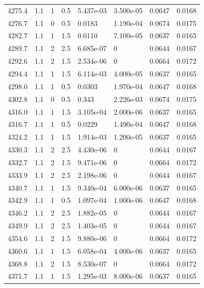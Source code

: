 \documentclass[preview]{standalone}
\begin{document}
{{{{{{{{{{{{{{{{\begin{tabular}{L{1.2cm}C{1.2cm} C{0.3cm}C{0.5cm} C{1.4cm}C{1.4cm} C{1.4cm}C{1.4cm}}
  4275.4  &   1.1  & 1     & 0.5 &  5.437e-03  & 3.500e-05  & 0.0647 &  0.0168   \\ 
  4276.7  &   1.1  & 0     & 0.5 &  0.0183  & 1.190e-04  & 0.0674 &  0.0175   \\ 
  4282.7  &   1.1  & 1     & 1.5 &  0.0110  & 7.100e-05  & 0.0637 &  0.0165   \\ 
  4289.7  &   1.1  & 2     & 2.5 &  6.685e-07  & 0  & 0.0644 &  0.0167   \\ 
  4292.6  &   1.1  & 2     & 1.5 &  2.534e-06  & 0  & 0.0664 &  0.0172   \\ 
  4294.4  &   1.1  & 1     & 1.5 &  6.114e-03  & 4.000e-05  & 0.0637 &  0.0165   \\ 
  4298.0  &   1.1  & 1     & 0.5 &  0.0303  & 1.970e-04  & 0.0647 &  0.0168   \\ 
  4302.8  &   1.1  & 0     & 0.5 &  0.343  & 2.226e-03  & 0.0674 &  0.0175   \\ 
  4316.0  &   1.1  & 1     & 1.5 &  3.105e-04  & 2.000e-06  & 0.0637 &  0.0165   \\ 
  4316.7  &   1.1  & 1     & 0.5 &  0.0229  & 1.490e-04  & 0.0647 &  0.0168   \\ 
  4324.2  &   1.1  & 1     & 1.5 &  1.914e-03  & 1.200e-05  & 0.0637 &  0.0165   \\ 
  4330.3  &   1.1  & 2     & 2.5 &  4.430e-06  & 0  & 0.0644 &  0.0167   \\ 
  4332.7  &   1.1  & 2     & 1.5 &  9.471e-06  & 0  & 0.0664 &  0.0172   \\ 
  4333.9  &   1.1  & 2     & 2.5 &  2.198e-06  & 0  & 0.0644 &  0.0167   \\ 
  4340.7  &   1.1  & 1     & 1.5 &  9.340e-04  & 6.000e-06  & 0.0637 &  0.0165   \\ 
  4342.9  &   1.1  & 1     & 0.5 &  1.097e-04  & 1.000e-06  & 0.0647 &  0.0168   \\ 
  4346.2  &   1.1  & 2     & 2.5 &  1.882e-05  & 0  & 0.0644 &  0.0167   \\ 
  4349.9  &   1.1  & 2     & 2.5 &  1.403e-05  & 0  & 0.0644 &  0.0167   \\ 
  4354.6  &   1.1  & 2     & 1.5 &  9.880e-06  & 0  & 0.0664 &  0.0172   \\ 
  4360.6  &   1.1  & 1     & 1.5 &  6.058e-04  & 4.000e-06  & 0.0637 &  0.0165   \\ 
  4368.8  &   1.1  & 2     & 1.5 &  8.530e-07  & 0  & 0.0664 &  0.0172   \\ 
  4371.7  &   1.1  & 1     & 1.5 &  1.295e-03  & 8.000e-06  & 0.0637 &  0.0165   \\ 

\end{tabular}}}}}}}}}}}}}}}}}
\end{document}
